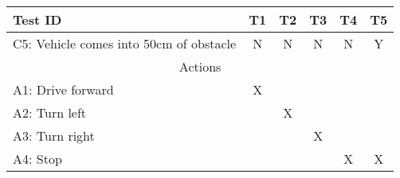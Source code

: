 \documentclass[12pt]{article}
\begin{document}
\begin{appendices}
\begin{center}
\begin{tabular}{ |l|c|c|c|c|c| } 
 \hline
  \textbf{Test ID} & T1 & T2 & T3 & T4 & T5 \\ 
 \hline
 C5: Vehicle comes into 50cm of obstacle& N& N& N& N& Y \\
 \hline
 \multicolumn{6}{|c|}{Actions} \\
 \hline

 A1: Drive forward &X & & & &\\
 \hline
 A2: Turn left & &X & & &\\
 \hline
 A3: Turn right & & &X & &\\
 \hline
 A4: Stop & & & &X &X\\
 \hline
\end{tabular}
\label{tab:maneuverDT}
\end{center}

\pagebreak
\end{appendices}
\end{document}
